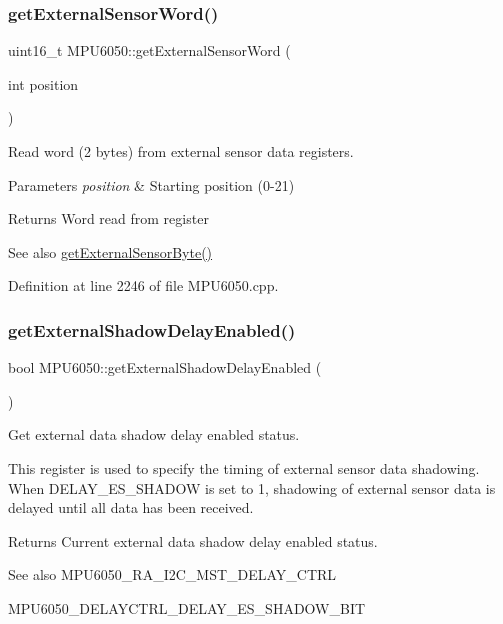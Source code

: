 \subsubsection{\texorpdfstring{getExternalSensorWord()}{getExternalSensorWord()}}
{\footnotesize\ttfamily uint16\+\_\+t M\+P\+U6050\+::get\+External\+Sensor\+Word (\begin{DoxyParamCaption}\item[{int}]{position }\end{DoxyParamCaption})}



Read word (2 bytes) from external sensor data registers. 


\begin{DoxyParams}{Parameters}
{\em position} & Starting position (0-\/21) \\
\hline
\end{DoxyParams}
\begin{DoxyReturn}{Returns}
Word read from register 
\end{DoxyReturn}
\begin{DoxySeeAlso}{See also}
\mbox{\hyperlink{classMPU6050_a7f786ab4264f40e5a95e8937ec9adcc2}{get\+External\+Sensor\+Byte()}} 
\end{DoxySeeAlso}


Definition at line 2246 of file M\+P\+U6050.\+cpp.

\mbox{\label{classMPU6050_a0e5cb13838298609b5260fd1558f8c92}} 
\subsubsection{\texorpdfstring{getExternalShadowDelayEnabled()}{getExternalShadowDelayEnabled()}}
{\footnotesize\ttfamily bool M\+P\+U6050\+::get\+External\+Shadow\+Delay\+Enabled (\begin{DoxyParamCaption}{ }\end{DoxyParamCaption})}



Get external data shadow delay enabled status. 

This register is used to specify the timing of external sensor data shadowing. When D\+E\+L\+A\+Y\+\_\+\+E\+S\+\_\+\+S\+H\+A\+D\+OW is set to 1, shadowing of external sensor data is delayed until all data has been received. \begin{DoxyReturn}{Returns}
Current external data shadow delay enabled status. 
\end{DoxyReturn}
\begin{DoxySeeAlso}{See also}
M\+P\+U6050\+\_\+\+R\+A\+\_\+\+I2\+C\+\_\+\+M\+S\+T\+\_\+\+D\+E\+L\+A\+Y\+\_\+\+C\+T\+RL 

M\+P\+U6050\+\_\+\+D\+E\+L\+A\+Y\+C\+T\+R\+L\+\_\+\+D\+E\+L\+A\+Y\+\_\+\+E\+S\+\_\+\+S\+H\+A\+D\+O\+W\+\_\+\+B\+IT 
\end{DoxySeeAlso}


